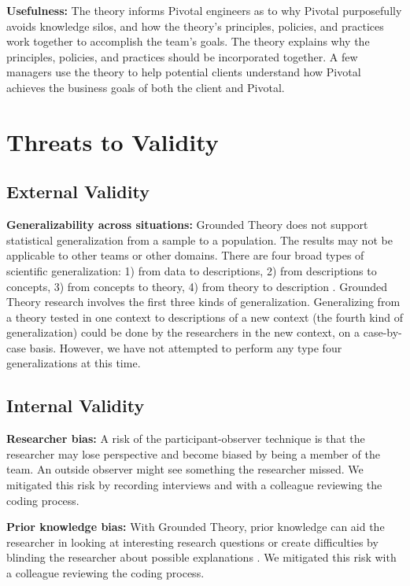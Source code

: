 \textbf{Usefulness:} The theory informs Pivotal engineers as to why Pivotal purposefully avoids knowledge silos, and how the theory’s principles, policies, and practices work together to accomplish the team’s goals. The theory explains why the principles, policies, and practices should be incorporated together. A few managers use  the theory to help potential clients understand how Pivotal achieves the business goals of both the client and Pivotal.

\section{Threats to Validity}

\subsection{External Validity}

\textbf{Generalizability across situations:} Grounded Theory does not support statistical generalization from a sample to a population. The results may not be applicable to other teams or other domains. There are four broad types of scientific generalization: 1) from data to descriptions, 2) from descriptions to concepts, 3) from concepts to theory, 4) from theory to description \cite{Lee2003generalizing}. Grounded Theory research involves the first three kinds of generalization. Generalizing from a theory tested in one context to descriptions of a new context (the fourth kind of generalization) could be done by the researchers in the new context, on a case-by-case basis. However, we have not attempted to perform any type four generalizations at this time.

\subsection{Internal Validity}
\textbf{Researcher bias:} A risk of the participant-observer technique is that the researcher may lose perspective and become biased by being a member of the team. An outside observer might see something the researcher missed. We mitigated this risk by recording interviews and with a colleague reviewing the coding process.

\textbf{Prior knowledge bias:} With Grounded Theory, prior knowledge can aid the researcher in looking at interesting research questions or create difficulties by blinding the researcher about possible explanations \cite{GlaserIssues}. We mitigated this risk with a colleague reviewing the coding process. 
